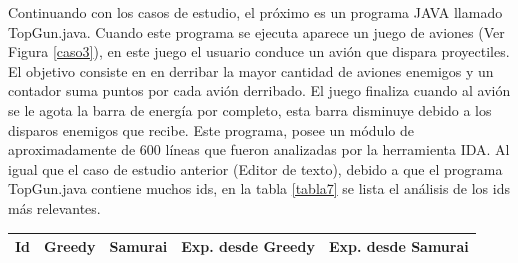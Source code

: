 Continuando con los casos de estudio, el próximo es un programa JAVA llamado TopGun.java. Cuando este programa se ejecuta aparece un juego de aviones (Ver Figura \ref{caso3}), en este juego el usuario conduce un avión que dispara proyectiles. El objetivo consiste en en derribar la mayor cantidad de aviones enemigos y un contador suma puntos por cada avión derribado. El juego finaliza cuando al avión se le agota la barra de energía por completo, esta barra disminuye debido a los disparos enemigos que recibe.
Este programa, posee un módulo de aproximadamente de 600 líneas que fueron analizadas por la herramienta IDA.
Al igual que el caso de estudio anterior (Editor de texto), debido a que el programa TopGun.java contiene muchos ids, en la tabla \ref{tabla7} se lista el análisis de los ids más relevantes.

\begin{table}

		\centering
   		\begin{tabular}{| c | c | c | c | c |}     
   		
       \hline
  	   \textbf{Id} & \textbf{Greedy} & \textbf{Samurai} & \textbf{Exp. desde Greedy} & \textbf{Exp. desde Samurai} \\ \hline


\end{tabular}
\end{table}
